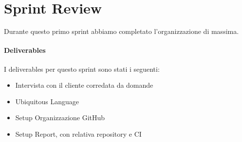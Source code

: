 \section{Sprint Review}
Durante questo primo sprint abbiamo completato l'organizzazione di massima.
\paragraph{Deliverables} 
I deliverables per questo sprint sono stati i seguenti:
\begin{itemize}
    \item Intervista con il cliente corredata da domande
    \item Ubiquitous Language
    \item Setup Organizzazione GitHub
    \item Setup Report, con relativa repository e CI
\end{itemize}
